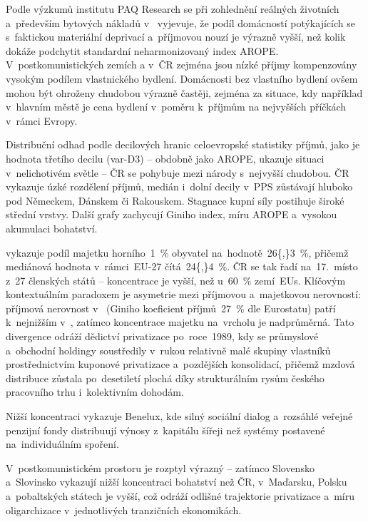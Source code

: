 Podle výzkumů institutu PAQ Research se při zohlednění reálných životních a~především bytových nákladů v~ vyjevuje, že podíl domácností potýkajících se s~faktickou materiální deprivací a~příjmovou nouzí je výrazně vyšší, než kolik dokáže podchytit standardní neharmonizovaný index \acs{AROPE}. V~postkomunistických zemích a v~\acs{ČR} zejména jsou nízké příjmy kompenzovány vysokým podílem vlastnického bydlení. Domácnosti bez vlastního bydlení ovšem mohou být ohroženy chudobou výrazně častěji, zejména za situace, kdy například v~hlavním městě je cena bydlení v~poměru k~příjmům na nejvyšších příčkách v~rámci Evropy.\par
Distribuční odhad podle decilových hranic celoevropské statistiky příjmů, jako je hodnota třetího decilu (\acs{var-D3}) -- obdobně jako \acs{AROPE}, ukazuje situaci v~nelichotivém světle -- \ac{ČR} se pohybuje mezi národy s~nejvyšší chudobou. \ac{ČR} vykazuje úzké rozdělení příjmů, medián i~dolní decily v~\acs{PPS} zůstávají hluboko pod Německem, Dánskem či Rakouskem. Stagnace kupní síly postihuje široké střední vrstvy. Další grafy zachycují Giniho index, míru \acs{AROPE} a~vysokou akumulaci bohatství.~\cite{PAQ_ChudobaCEEU_2025}\par



 vykazuje podíl majetku horního~\SI{1}{\percent} obyvatel na~hodnotě~\SI{26{,}3}{\percent}, přičemž mediánová hodnota v~rámci~\acs{EU}-27 čítá~\SI{24{,}4}{\percent}.
\acs{ČR} se tak řadí na~17.~místo z~27 členských států -- koncentrace je vyšší, než u~\SI{60}{\percent} zemí~\acp{EU}.
Klíčovým kontextuálním paradoxem je asymetrie mezi příjmovou a~majetkovou nerovností: příjmová nerovnost v~ (Giniho koeficient příjmů~\SI{27}{\percent} dle Eurostatu) patří k~nejnižším v~, zatímco koncentrace majetku na~vrcholu je nadprůměrná.
Tato divergence odráží dědictví privatizace po~roce~1989, kdy se průmyslové a~obchodní holdingy soustředily v~rukou relativně malé skupiny vlastníků prostřednictvím kuponové privatizace a~pozdějších konsolidací, přičemž mzdová distribuce zůstala po~desetiletí plochá díky strukturálním rysům českého pracovního trhu i~kolektivním dohodám.\par

Nižší koncentraci vykazuje Benelux, kde silný sociální dialog a~rozsáhlé veřejné penzijní fondy distribuují výnosy z~kapitálu šířeji než systémy postavené na~individuálním spoření.\par
V~postkomunistickém prostoru je rozptyl výrazný -- zatímco Slovensko a~Slovinsko vykazují nižší koncentraci bohatství než \acs{ČR}, v~Maďarsku, Polsku a~pobaltských státech je vyšší, což odráží odlišné trajektorie privatizace a~míru oligarchizace v~jednotlivých tranzičních ekonomikách.\par



